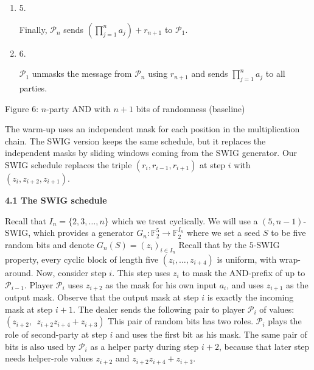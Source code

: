 \documentclass[10pt,a4paper]{article}
\begin{document}
\begin{enumerate}
\item[] 
5. 


Finally, $\mathcal{P}_{n}$ sends $(\prod_{j=1}^{n}a_{j})+r_{n+1}$ to $\mathcal{P}_{1}$.\par





\item[] 
6. 


$\mathcal{P}_{1}$ unmasks the message from $\mathcal{P}_{n}$ using $r_{n+1}$ and sends $\prod_{j=1}^{n}a_{j}$ to all parties.\par





\end{enumerate}


Figure 6: $n$-party AND with $n+1$ bits of randomness (baseline)



The warm-up uses an independent mask for each position in the multiplication chain. The SWIG version keeps the same schedule, but it replaces the independent masks by sliding windows coming from the SWIG generator. Our SWIG schedule replaces the triple $(r_{i},r_{i-1},r_{i+1})$ at step $i$ with $(z_{i},z_{i+2},z_{i+1})$.\par




\par\medskip\noindent\textbf{
4.1 The SWIG schedule}\par




Recall that $I_{n}=\{2,3,\dots,n\}$ which we treat cyclically. We will use
a $(5,n-1)$-SWIG, which provides a generator
$G_{n}:\mathbb{F}_{2}^{5}\to\mathbb{F}_{2}^{I_{n}}$
where we set a seed $S$ to be five random bits and denote
$G_{n}(S)=(z_{i})_{i\in I_{n}}$
Recall that by the $5$-SWIG property, every cyclic block of length five
$(z_{i},\ldots,z_{i+4})$ is uniform, with wrap-around. Now, consider step $i$. This step uses $z_{i}$ to mask the AND-prefix of up to $\mathcal{P}_{i-1}$. Player $\mathcal{P}_{i}$ uses $z_{i+2}$ as the mask for his own input $a_{i}$, and uses $z_{i+1}$ as the output mask. Observe that the output mask at step $i$ is exactly the incoming mask at step $i+1$. The dealer sends the following pair to player $\mathcal{P}_{i}$ of values:
$(z_{i+2},\ \ z_{i+2}z_{i+4}+z_{i+3})$
This pair of random bits has two roles. $\mathcal{P}_{i}$ plays the role of second-party at step $i$ and uses the first bit as his mask. The same pair of bits is also used by $\mathcal{P}_{i}$ as a helper party during step $i+2$, because that later step needs helper-role values
$z_{i+2}$ and
$z_{i+2}z_{i+4}+z_{i+3}$.\par
\end{document}
